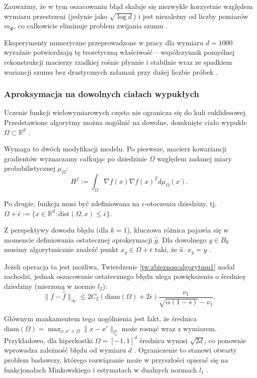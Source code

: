 Zauważmy, że w tym oszacowaniu błąd skaluje się niezwykle korzystnie względem wymiaru przestrzeni (jedynie jako $\sqrt{\log d}$) i jest niezależny od liczby pomiarów $m_\Phi$, co całkowicie eliminuje problem zwijania szumu .

Eksperymenty numeryczne przeprowadzone w pracy \cite{fornasier2012learning} dla wymiaru $d=1000$ wyraźnie potwierdzają tę teoretyczną właściwość – współczynnik pomyślnej rekonstrukcji macierzy rzadkiej rośnie płynnie i stabilnie wraz ze spadkiem wariancji szumu bez drastycznych załamań przy dużej liczbie próbek .

\subsubsection{Aproksymacja na dowolnych ciałach wypukłych}

Uczenie funkcji wielowymiarowych często nie ogranicza się do kuli euklidesowej. Przedstawione algorytmy można uogólnić na dowolne, domknięte ciało wypukłe $\Omega \subset \mathbb{R}^d$ .

Wymaga to dwóch modyfikacji modelu. Po pierwsze, macierz kowariancji gradientów wyznaczamy całkując po dziedzinie $\Omega$ względem zadanej miary probabilistycznej $\mu_\Omega$:
$$H^f := \int_\Omega \nabla f(x)\nabla f(x)^T d\mu_\Omega(x).$$

Po drugie, funkcja musi być zdefiniowana na $\epsilon$-otoczeniu dziedziny, tj. $\Omega + \bar{\epsilon} := \{x \in \mathbb{R}^d : \text{dist}(\Omega, x) \le \bar{\epsilon}\}$.

Z perspektywy dowodu błędu (dla $k=1$), kluczowa różnica pojawia się w momencie definiowania ostatecznej aproksymacji $\hat{g}$. Dla dowolnego $y \in B_{\mathbb{R}}$ musimy algorytmicznie znaleźć punkt $x_y \in \Omega + \bar{\epsilon}$ taki, że $\hat{a} \cdot x_y = y$ . 

Jeżeli operacja ta jest możliwa, Twierdzenie \ref{tw:zbieznoscalgorytmu1} nadal zachodzi, jednak oszacowanie ostatecznego błędu ulega powiększeniu o średnicę dziedziny (mierzoną w normie $l_2$):
$$\|f - \hat{f}\|_\infty \le 2C_2(\text{diam}(\Omega) + 2\bar{\epsilon})\frac{\nu_1}{\sqrt{\alpha(1-s)} - \nu_1}.$$


Głównym mankamentem tego uogólnienia jest fakt, że średnica $\text{diam}(\Omega) = \max_{x,x' \in \Omega} \|x-x'\|_{l_2^d}$ może rosnąć wraz z wymiarem. Przykładowo, dla hiperkostki $\Omega = [-1, 1]^d$ średnica wynosi $\sqrt{2d}$, co ponownie wprowadza zależność błędu od wymiaru $d$ \cite{fornasier2012learning} . Ograniczenie to stanowi otwarty problem badawczy, którego rozwiązanie może w przyszłości opierać się na funkcjonałach Minkowskiego i estymatach w dualnych normach $l_1$ .